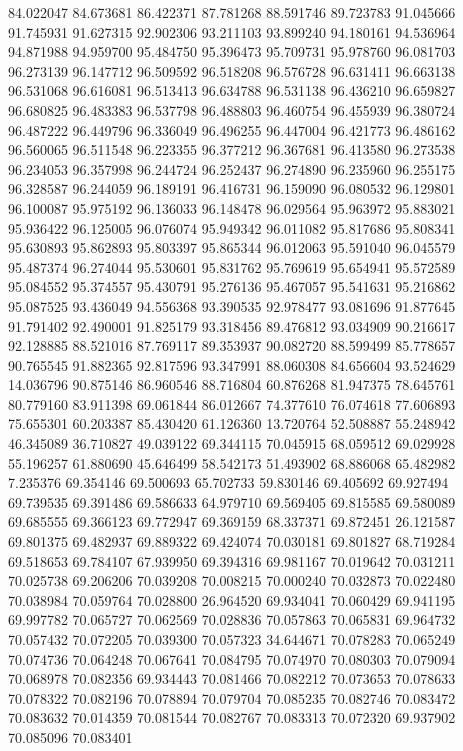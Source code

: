 84.022047
84.673681
86.422371
87.781268
88.591746
89.723783
91.045666
91.745931
91.627315
92.902306
93.211103
93.899240
94.180161
94.536964
94.871988
94.959700
95.484750
95.396473
95.709731
95.978760
96.081703
96.273139
96.147712
96.509592
96.518208
96.576728
96.631411
96.663138
96.531068
96.616081
96.513413
96.634788
96.531138
96.436210
96.659827
96.680825
96.483383
96.537798
96.488803
96.460754
96.455939
96.380724
96.487222
96.449796
96.336049
96.496255
96.447004
96.421773
96.486162
96.560065
96.511548
96.223355
96.377212
96.367681
96.413580
96.273538
96.234053
96.357998
96.244724
96.252437
96.274890
96.235960
96.255175
96.328587
96.244059
96.189191
96.416731
96.159090
96.080532
96.129801
96.100087
95.975192
96.136033
96.148478
96.029564
95.963972
95.883021
95.936422
96.125005
96.076074
95.949342
96.011082
95.817686
95.808341
95.630893
95.862893
95.803397
95.865344
96.012063
95.591040
96.045579
95.487374
96.274044
95.530601
95.831762
95.769619
95.654941
95.572589
95.084552
95.374557
95.430791
95.276136
95.467057
95.541631
95.216862
95.087525
93.436049
94.556368
93.390535
92.978477
93.081696
91.877645
91.791402
92.490001
91.825179
93.318456
89.476812
93.034909
90.216617
92.128885
88.521016
87.769117
89.353937
90.082720
88.599499
85.778657
90.765545
91.882365
92.817596
93.347991
88.060308
84.656604
93.524629
14.036796
90.875146
86.960546
88.716804
60.876268
81.947375
78.645761
80.779160
83.911398
69.061844
86.012667
74.377610
76.074618
77.606893
75.655301
60.203387
85.430420
61.126360
13.720764
52.508887
55.248942
46.345089
36.710827
49.039122
69.344115
70.045915
68.059512
69.029928
55.196257
61.880690
45.646499
58.542173
51.493902
68.886068
65.482982
7.235376
69.354146
69.500693
65.702733
59.830146
69.405692
69.927494
69.739535
69.391486
69.586633
64.979710
69.569405
69.815585
69.580089
69.685555
69.366123
69.772947
69.369159
68.337371
69.872451
26.121587
69.801375
69.482937
69.889322
69.424074
70.030181
69.801827
68.719284
69.518653
69.784107
67.939950
69.394316
69.981167
70.019642
70.031211
70.025738
69.206206
70.039208
70.008215
70.000240
70.032873
70.022480
70.038984
70.059764
70.028800
26.964520
69.934041
70.060429
69.941195
69.997782
70.065727
70.062569
70.028836
70.057863
70.065831
69.964732
70.057432
70.072205
70.039300
70.057323
34.644671
70.078283
70.065249
70.074736
70.064248
70.067641
70.084795
70.074970
70.080303
70.079094
70.068978
70.082356
69.934443
70.081466
70.082212
70.073653
70.078633
70.078322
70.082196
70.078894
70.079704
70.085235
70.082746
70.083472
70.083632
70.014359
70.081544
70.082767
70.083313
70.072320
69.937902
70.085096
70.083401
